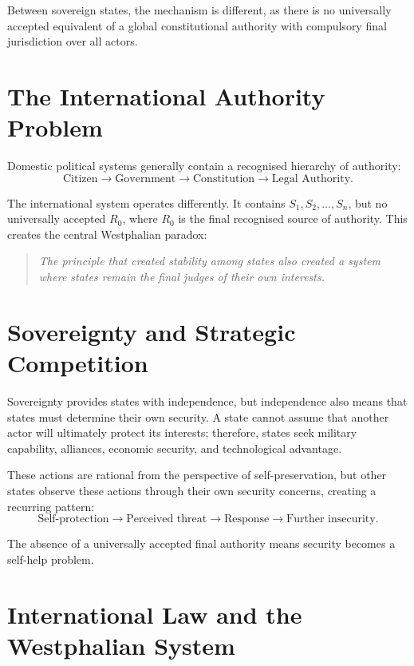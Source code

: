 \documentclass[11pt,openany]{book}
\theoremstyle{plain}
\theoremstyle{definition}
\begin{document}
Between sovereign states, the mechanism is different, as there is no universally accepted equivalent of a global constitutional authority with compulsory final jurisdiction over all actors.

\section*{The International Authority Problem}

Domestic political systems generally contain a recognised hierarchy of authority:
\[
\text{Citizen}
\longrightarrow
\text{Government}
\longrightarrow
\text{Constitution}
\longrightarrow
\text{Legal Authority}.
\]

The international system operates differently. It contains \(S_1, S_2, \ldots, S_n\), but no universally accepted \(R_0\), where \(R_0\) is the final recognised source of authority. This creates the central Westphalian paradox:
\begin{quote}
\textit{The principle that created stability among states also created a system where states remain the final judges of their own interests.}
\end{quote}

\section*{Sovereignty and Strategic Competition}

Sovereignty provides states with independence, but independence also means that states must determine their own security. A state cannot assume that another actor will ultimately protect its interests; therefore, states seek military capability, alliances, economic security, and technological advantage.

These actions are rational from the perspective of self-preservation, but other states observe these actions through their own security concerns, creating a recurring pattern:
\[
\text{Self-protection}
\longrightarrow
\text{Perceived threat}
\longrightarrow
\text{Response}
\longrightarrow
\text{Further insecurity}.
\]

The absence of a universally accepted final authority means security becomes a self-help problem.

\section*{International Law and the Westphalian System}
\end{document}
